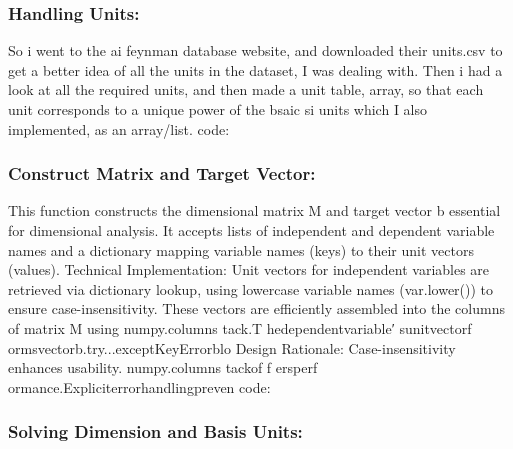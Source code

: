 \documentclass{article}
\begin{document}
\subsubsection{Handling Units:}

So i went to the ai feynman database website, and downloaded their units.csv to get a better idea of all the units
in the dataset, I was dealing with. Then i had a look at all the required units, and then made a unit table, array,
so that each unit corresponds to a unique power of the bsaic si units which I also implemented, as an array/list.
code: \\


\subsubsection{Construct Matrix and Target Vector:}

This function constructs the dimensional matrix M and target vector b essential for dimensional analysis. It
accepts lists of independent and dependent variable names and a dictionary mapping variable names (keys) to
their unit vectors (values).
Technical Implementation: Unit vectors for independent variables are retrieved via dictionary lookup, using
lowercase variable names (var.lower()) to ensure case-insensitivity. These vectors are efficiently assembled into
the columns of matrix M using numpy.columns tack.T hedependentvariable′ sunitvectorf ormsvectorb.try...exceptKeyErrorblo
Design Rationale: Case-insensitivity enhances usability. numpy.columns tackof f ersperf ormance.Expliciterrorhandlingpreven
code:\\ 


\subsubsection{Solving Dimension and Basis Units:}
\end{document}
